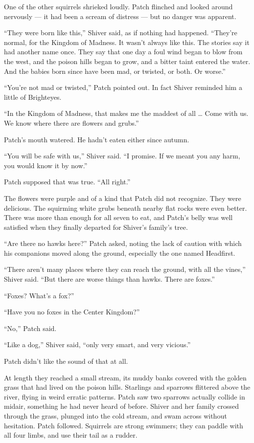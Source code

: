 \documentclass[12pt]{memoir}
\begin{document}
One of the other squirrels shrieked loudly. Patch flinched and looked
around nervously — it had been a scream of distress — but no danger
was apparent.

“They were born like this,” Shiver said, as if nothing had
happened. “They’re normal, for the Kingdom of Madness. It wasn’t
always like this. The stories say it had another name once. They say
that one day a foul wind began to blow from the west, and the poison
hills began to grow, and a bitter taint entered the water. And the
babies born since have been mad, or twisted, or both. Or worse.”

“You’re not mad or twisted,” Patch pointed out. In fact Shiver
reminded him a little of Brighteyes.

“In the Kingdom of Madness, that makes me the maddest of all … Come
with us. We know where there are flowers and grubs.”

Patch’s mouth watered. He hadn’t eaten either since autumn.

“You will be safe with us,” Shiver said. “I promise. If we meant you
any harm, you would know it by now.”

Patch supposed that was true. “All right.”

The flowers were purple and of a kind that Patch did not
recognize. They were delicious. The squirming white grubs beneath
nearby flat rocks were even better. There was more than enough for all
seven to eat, and Patch’s belly was well satisfied when they finally
departed for Shiver’s family’s tree.

“Are there no hawks here?” Patch asked, noting the lack of caution
with which his companions moved along the ground, especially the one
named Headfirst.

“There aren’t many places where they can reach the ground, with all
the vines,” Shiver said. “But there are worse things than hawks. There
are foxes.”

“Foxes? What’s a fox?”

“Have you no foxes in the Center Kingdom?”

“No,” Patch said.

“Like a dog,” Shiver said, “only very smart, and very vicious.”

Patch didn’t like the sound of that at all.

At length they reached a small stream, its muddy banks covered with
the golden grass that had lived on the poison hills. Starlings and
sparrows flittered above the river, flying in weird erratic
patterns. Patch saw two sparrows actually collide in midair, something
he had never heard of before. Shiver and her family crossed through
the grass, plunged into the cold stream, and swam across without
hesitation. Patch followed. Squirrels are strong swimmers; they can
paddle with all four limbs, and use their tail as a rudder.
\end{document}
